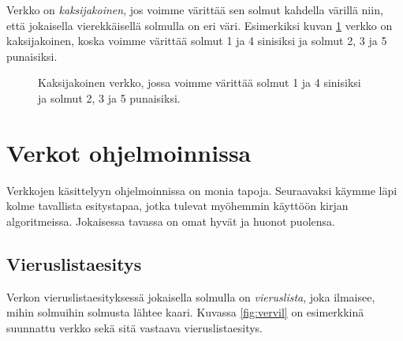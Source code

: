 Verkko on \emph{kaksijakoinen}, jos voimme värittää sen
solmut kahdella värillä niin, että jokaisella
vierekkäisellä solmulla on eri väri.
Esimerkiksi kuvan \ref{fig:verkak} verkko on kaksijakoinen,
koska voimme värittää solmut 1 ja 4 sinisiksi ja
solmut 2, 3 ja 5 punaisiksi.

\begin{figure}
\center
\begin{center}
\end{center}
\caption{Kaksijakoinen verkko, jossa voimme värittää solmut 1 ja 4
sinisiksi ja solmut 2, 3 ja 5 punaisiksi.}
\label{fig:verkak}
\end{figure}

\section{Verkot ohjelmoinnissa}

Verkkojen käsittelyyn ohjelmoinnissa on monia tapoja.
Seuraavaksi käymme läpi kolme tavallista esitystapaa,
jotka tulevat myöhemmin käyttöön kirjan algoritmeissa.
Jokaisessa tavassa on omat hyvät ja huonot puolensa.

\subsection{Vieruslistaesitys}

Verkon vieruslistaesityksessä jokaisella solmulla on
\emph{vieruslista}, joka ilmaisee, mihin solmuihin
solmusta lähtee kaari.
Kuvassa \ref{fig:vervil} on esimerkkinä suunnattu verkko
sekä sitä vastaava vieruslistaesitys.

